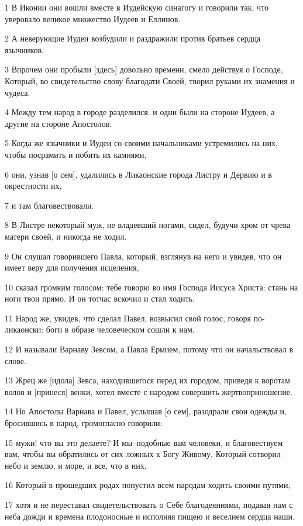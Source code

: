 \par 1 В Иконии они вошли вместе в Иудейскую синагогу и говорили так, что уверовало великое множество Иудеев и Еллинов.
\par 2 А неверующие Иудеи возбудили и раздражили против братьев сердца язычников.
\par 3 Впрочем они пробыли [здесь] довольно времени, смело действуя о Господе, Который, во свидетельство слову благодати Своей, творил руками их знамения и чудеса.
\par 4 Между тем народ в городе разделился: и одни были на стороне Иудеев, а другие на стороне Апостолов.
\par 5 Когда же язычники и Иудеи со своими начальниками устремились на них, чтобы посрамить и побить их камнями,
\par 6 они, узнав [о сем], удалились в Ликаонские города Листру и Дервию и в окрестности их,
\par 7 и там благовествовали.
\par 8 В Листре некоторый муж, не владевший ногами, сидел, будучи хром от чрева матери своей, и никогда не ходил.
\par 9 Он слушал говорившего Павла, который, взглянув на него и увидев, что он имеет веру для получения исцеления,
\par 10 сказал громким голосом: тебе говорю во имя Господа Иисуса Христа: стань на ноги твои прямо. И он тотчас вскочил и стал ходить.
\par 11 Народ же, увидев, что сделал Павел, возвысил свой голос, говоря по-ликаонски: боги в образе человеческом сошли к нам.
\par 12 И называли Варнаву Зевсом, а Павла Ермием, потому что он начальствовал в слове.
\par 13 Жрец же [идола] Зевса, находившегося перед их городом, приведя к воротам волов и [принеся] венки, хотел вместе с народом совершить жертвоприношение.
\par 14 Но Апостолы Варнава и Павел, услышав [о сем], разодрали свои одежды и, бросившись в народ, громогласно говорили:
\par 15 мужи! что вы это делаете? И мы--подобные вам человеки, и благовествуем вам, чтобы вы обратились от сих ложных к Богу Живому, Который сотворил небо и землю, и море, и все, что в них,
\par 16 Который в прошедших родах попустил всем народам ходить своими путями,
\par 17 хотя и не переставал свидетельствовать о Себе благодеяниями, подавая нам с неба дожди и времена плодоносные и исполняя пищею и веселием сердца наши.
